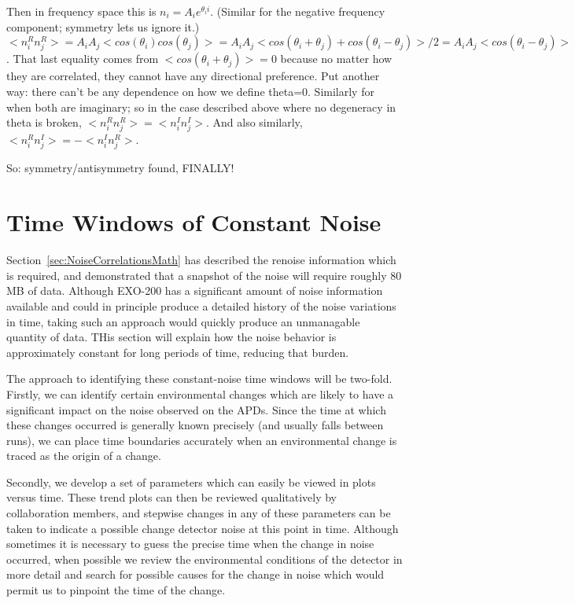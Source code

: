 Then in frequency space this is $n_i = A_i e^{\theta_i i}$.  (Similar for the negative frequency component; symmetry lets us ignore it.)
$<n^R_i n^R_j> = A_i A_j <cos(\theta_i) cos(\theta_j)> = A_i A_j <cos(\theta_i + \theta_j) + cos(\theta_i - \theta_j)>/2 = A_i A_j <cos(\theta_i - \theta_j)>$.
That last equality comes from $<cos(\theta_i + \theta_j)> = 0$ because no matter how they are correlated, they cannot have any directional preference.  Put another way: there can't be any dependence on how we define theta=0.
Similarly for when both are imaginary; so in the case described above where no degeneracy in theta is broken, $<n^R_i n^R_j> = <n^I_i n^I_j>$.
And also similarly, $<n^R_i n^I_j> = -<n^I_i n^R_j>$.

So: symmetry/antisymmetry found, FINALLY!

\section{Time Windows of Constant Noise}\label{sec:NoiseCorrelationsTimeWindows}

Section~\ref{sec:NoiseCorrelationsMath} has described the renoise information which is required, and demonstrated that a snapshot of the noise will require roughly 80 MB of data.  Although EXO-200 has a significant amount of noise information available and could in principle produce a detailed history of the noise variations in time, taking such an approach would quickly produce an unmanagable quantity of data.  THis section will explain how the noise behavior is approximately constant for long periods of time, reducing that burden.

The approach to identifying these constant-noise time windows will be two-fold.  Firstly, we can identify certain environmental changes which are likely to have a significant impact on the noise observed on the APDs.  Since the time at which these changes occurred is generally known precisely (and usually falls between runs), we can place time boundaries accurately when an environmental change is traced as the origin of a change.

Secondly, we develop a set of parameters which can easily be viewed in plots versus time.  These trend plots can then be reviewed qualitatively by collaboration members, and stepwise changes in any of these parameters can be taken to indicate a possible change detector noise at this point in time.  Although sometimes it is necessary to guess the precise time when the change in noise occurred, when possible we review the environmental conditions of the detector in more detail and search for possible causes for the change in noise which would permit us to pinpoint the time of the change.

